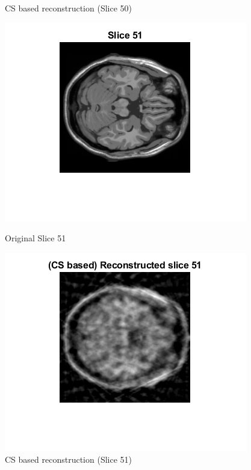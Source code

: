 \documentclass[12pt]{article}
\begin{document}
\begin{enumerate}[label = (\alph*)]
\begin{figure}[H]
\begin{minipage}{.45\textwidth}
            \caption*{CS based reconstruction (Slice 50) }
        \end{minipage}
    \end{figure}
    \begin{figure}[H]
        \centering
        \begin{minipage}{.45\textwidth}
            \centering
            \includegraphics[width=\linewidth]{Images/Q3_51.png}
            \caption*{Original Slice 51}
        \end{minipage}
        \begin{minipage}{.45\textwidth}
            \centering
            \includegraphics[width=\linewidth]{Images/Q3_51_b.png}
            \caption*{CS based reconstruction (Slice 51)}
        \end{minipage}
    \end{figure}


\end{enumerate}
\end{document}
